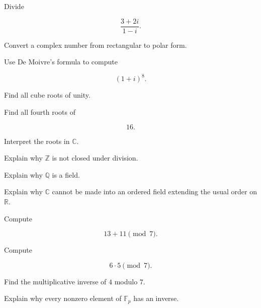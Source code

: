 \begin{exercise}[2]
Divide

\[
\frac{3+2i}{1-i}.
\]
\end{exercise}

\begin{exercise}[3]
Convert a complex number from rectangular to polar form.
\end{exercise}

\begin{exercise}[3]
Use De Moivre's formula to compute

\[
(1+i)^8.
\]
\end{exercise}

\begin{exercise}[3]
Find all cube roots of unity.
\end{exercise}

\begin{exercise}[3]
Find all fourth roots of

\[
16.
\]

Interpret the roots in \(\mathbb{C}\).
\end{exercise}

\begin{exercise}[2]
Explain why \(\mathbb{Z}\) is not closed under division.
\end{exercise}

\begin{exercise}[2]
Explain why \(\mathbb{Q}\) is a field.
\end{exercise}

\begin{exercise}[3]
Explain why \(\mathbb{C}\) cannot be made into an ordered field extending the
usual order on \(\mathbb{R}\).
\end{exercise}

\begin{exercise}[2]
Compute

\[
13+11
\pmod 7.
\]
\end{exercise}

\begin{exercise}[2]
Compute

\[
6\cdot5
\pmod 7.
\]
\end{exercise}

\begin{exercise}[3]
Find the multiplicative inverse of \(4\) modulo \(7\).
\end{exercise}

\begin{exercise}[3]
Explain why every nonzero element of \(\mathbb{F}_p\) has an inverse.
\end{exercise}

